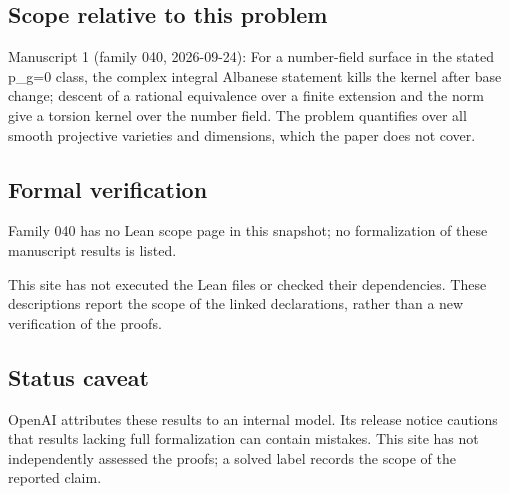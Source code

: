 \documentclass[11pt]{article}
\begin{document}
\subsection{Scope relative to this problem}
Manuscript 1 (family 040, 2026-09-24): For a number-field surface in the stated p\_g=0 class, the complex integral Albanese statement kills the kernel after base change; descent of a rational equivalence over a finite extension and the norm give a torsion kernel over the number field. The problem quantifies over all smooth projective varieties and dimensions, which the paper does not cover.

\subsection{Formal verification}
Family 040 has no Lean scope page in this snapshot; no formalization of these manuscript results is listed.

This site has not executed the Lean files or checked their dependencies. These descriptions report the scope of the linked declarations, rather than a new verification of the proofs.

\subsection{Status caveat}
OpenAI attributes these results to an internal model. Its release notice cautions that results lacking full formalization can contain mistakes. This site has not independently assessed the proofs; a solved label records the scope of the reported claim.
\end{document}
